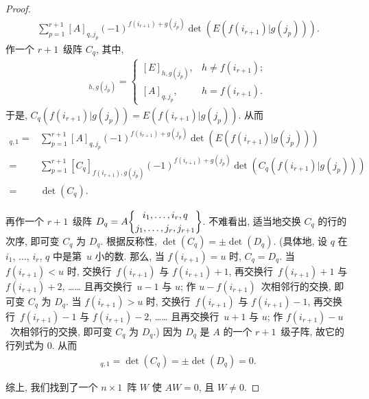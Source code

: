 \documentclass[../libro.tex]{subfiles}
\begin{document}
\begin{proof}
\begin{align*}
        \sum_{p=1}^{r+1}
        {[A]_{q,j_p}
            (-1)^{f(i_{r+1})+g(j_p)}
        \det {(E(f(i_{r+1})|g(j_p)))}}.
    \end{align*}
    作一个 \(r+1\)~级阵 \(C_q\), 其中,
    \begin{align*}
        [C_q]_{h,g(j_p)} =
        \begin{cases}
            [E]_{h,g(j_p)},
            & h \neq f(i_{r+1}); \\
            [A]_{q,j_p},
            & h = f(i_{r+1}).
        \end{cases}
    \end{align*}
    于是, \(C_q(f(i_{r+1})|g(j_p))
    = E(f(i_{r+1})|g(j_p))\).
    从而
    \begin{align*}
        [AW]_{q,1}
        = {} &
        \sum_{p=1}^{r+1}
        {[A]_{q,j_p}
            (-1)^{f(i_{r+1})+g(j_p)}
        \det {(E(f(i_{r+1})|g(j_p)))}}
        \\
        = {} &
        \sum_{p=1}^{r+1}
        {[C_q]_{f(i_{r+1}),g(j_p)}
            (-1)^{f(i_{r+1})+g(j_p)}
        \det {(C_q (f(i_{r+1})|g(j_p)))}}
        \\
        = {} &
        \det {(C_q)}.
    \end{align*}

    再作一个 \(r+1\)~级阵
    \(
        D_q =
        A\submat{i_1,\dots,i_r,q}
        {j_1,\dots,j_r,j_{r+1}}
    \).
    不难看出, 适当地交换 \(C_q\) 的行的次序,
    即可变 \(C_q\) 为 \(D_q\).
    根据反称性,
    \(\det {(C_q)} = \pm \det {(D_q)}\).
    (具体地, 设 \(q\) 在 %
    \(i_1\), \(\dots\), \(i_r\), \(q\)
    中是第~\(u\) 小的数.
    那么, 当 \(f(i_{r+1}) = u\) 时, \(C_q = D_q\).
    当 \(f(i_{r+1}) < u\) 时,
    交换行~\(f(i_{r+1})\) 与 \(f(i_{r+1})+1\),
    再交换行~\(f(i_{r+1})+1\) 与 \(f(i_{r+1})+2\),
    ……
    且再交换行~\(u-1\) 与 \(u\);
    作 \(u - f(i_{r+1})\)~次相邻行的交换,
    即可变 \(C_q\) 为 \(D_q\).
    当 \(f(i_{r+1}) > u\) 时,
    交换行~\(f(i_{r+1})\) 与 \(f(i_{r+1})-1\),
    再交换行~\(f(i_{r+1})-1\) 与 \(f(i_{r+1})-2\),
    ……
    且再交换行~\(u+1\) 与 \(u\);
    作 \(f(i_{r+1}) - u\)~次相邻行的交换,
    即可变 \(C_q\) 为 \(D_q\).) %
    因为 \(D_q\) 是 \(A\) 的一个 \(r+1\)~级子阵,
    故它的行列式为 \(0\).
    从而
    \begin{align*}
        [AW]_{q,1}
        = \det {(C_q)}
        = \pm \det {(D_q)}
        = 0.
    \end{align*}

    综上, 我们找到了一个 \(n \times 1\)~阵 \(W\)
    使 \(AW = 0\), 且 \(W \neq 0\).
\end{proof}
\end{document}
